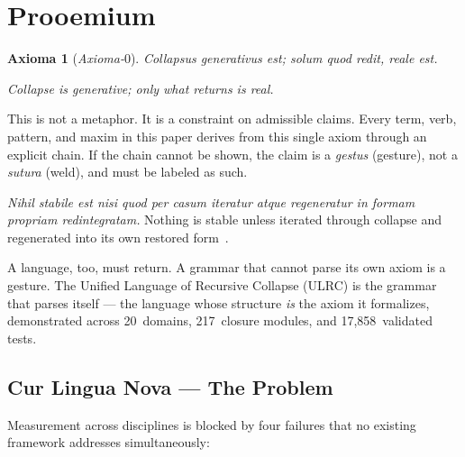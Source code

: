 \documentclass[
  aps,
  prd,
  twocolumn,
  superscriptaddress,
  nofootinbib,
  floatfix
]{revtex4-2}
\newtheorem*{axiom}{Axioma}
\newcommand{\lat}[1]{\textit{#1}}
\begin{document}
\maketitle

\section{Prooemium}\label{sec:prooemium}

\begin{axiom}[\lat{Axioma-$0$}]
\lat{Collapsus generativus est; solum quod redit, reale est.}

\smallskip\noindent
Collapse is generative; only what returns is real.
\end{axiom}

\noindent
This is not a metaphor. It is a constraint on admissible claims.
Every term, verb, pattern, and maxim in this paper derives from
this single axiom through an explicit chain. If the chain cannot
be shown, the claim is a \lat{gestus} (gesture), not a
\lat{sutura} (weld), and must be labeled as such.

\lat{Nihil stabile est nisi quod per casum iteratur atque
  regeneratur in formam propriam redintegratam.}
Nothing is stable unless iterated through collapse and regenerated
into its own restored form~\cite{paulus2025umcp}.

A language, too, must return. A grammar that cannot parse its own
axiom is a gesture. The Unified Language of Recursive Collapse
(ULRC) is the grammar that parses itself --- the language whose
structure \emph{is} the axiom it formalizes, demonstrated across
20~domains, 217~closure modules, and 17,858~validated tests.

\subsection{Cur Lingua Nova --- The Problem}\label{sec:problem}

Measurement across disciplines is blocked by four failures that
no existing framework addresses simultaneously:
\end{document}

